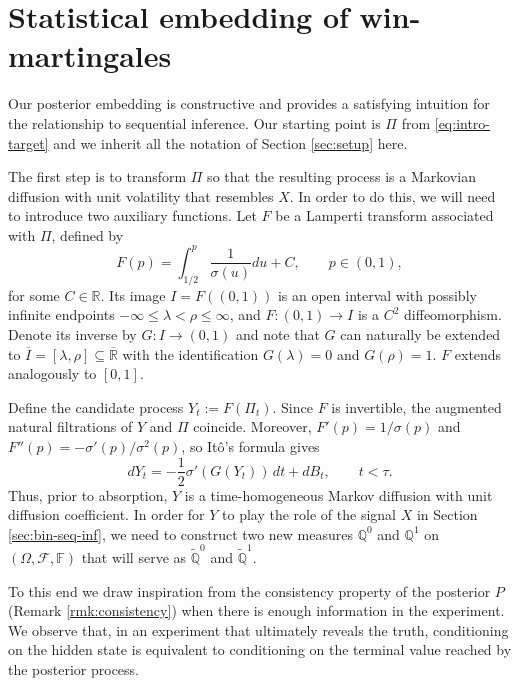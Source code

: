 \documentclass[11pt, reqno]{amsart}
\theoremstyle{plain}
\theoremstyle{remark}
\numberwithin{equation}{section}
\begin{document}
%
%
%
%
%
%
%
%
%
%
%
%
%
%
%
%
%
%
%
%
%

%
%


%


\section{Statistical embedding of win-martingales}\label{sec:embedding}

Our posterior embedding is constructive and provides a satisfying intuition for the relationship to sequential inference. Our starting point is $\Pi$ from \eqref{eq:intro-target} and we inherit all the notation of Section \ref{sec:setup} here. 

The first step is to transform $\Pi$ so that the resulting process is a Markovian diffusion with unit volatility that resembles $X$. In order to do this, we will need to introduce two auxiliary functions. Let $F$ be a Lamperti transform associated with $\Pi$, defined by 
\begin{equation}\label{eq:F-def}
  F(p)=\int_{1/2}^p \frac{1}{\sigma(u)}du+C, \qquad p\in(0,1),
\end{equation}
for some $C\in\mathbb R$.
Its image $I=F((0,1))$ is an open interval with possibly infinite endpoints $-\infty\leq \lambda< \rho\leq\infty$, and $F:(0,1)\to I$ is a $C^2$ diffeomorphism. Denote its inverse by $G:I\to(0,1)$ and note that $G$ can naturally be extended to $\overline{I}=[\lambda,\rho]\subseteq \overline{\mathbb{R}}$ with the identification $G(\lambda) = 0$ and $G(\rho)=1$. $F$ extends analogously to $[0,1]$.

Define the candidate process $Y_t:=F(\Pi_t)$. Since $F$ is invertible, the augmented natural filtrations of $Y$ and
$\Pi$ coincide. Moreover, $F'(p)=1/\sigma(p)$ and $F''(p)=-\sigma'(p)/\sigma^2(p)$,
so It\^o's formula gives
\begin{equation}\label{eq:Y-under-P}
  dY_t
  =
  -\frac12\sigma'(G(Y_t))\,dt+dB_t,
  \qquad t<\tau.
\end{equation}
Thus, prior to absorption, $Y$ is a time-homogeneous Markov diffusion
with unit diffusion coefficient.
In order for $Y$ to play the role of the signal $X$ in Section \ref{sec:bin-seq-inf}, we need to construct two new measures $\mathbb{Q}^0$ and $\mathbb{Q}^1$ on $(\Omega, \mathcal{F},\mathbb{F})$ that will serve as $\widetilde{\mathbb{Q}}^0$ and $\widetilde{\mathbb{Q}}^1$. 

To this end we draw inspiration from the consistency property of the posterior $P$ (Remark \ref{rmk:consistency}) when there is enough information in the experiment. We observe that,
%
%
%
%
%
%
%
%
in an experiment that ultimately reveals the truth, conditioning on the hidden state is equivalent to conditioning on the terminal value reached by the posterior process. 
\end{document}
